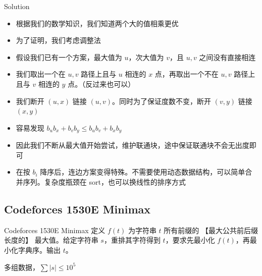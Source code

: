 ﻿\documentclass[aspectratio=169]{ctexbeamer}
\begin{document}
\begin{frame}{Solution}
    \begin{itemize}
        \item 根据我们的数学知识，我们知道两个大的值相乘更优
        \item 为了证明，我们考虑调整法
        \item 假设我们已有一个方案，最大值为 $u$，次大值为 $v$，且 $u,v$ 之间没有直接相连
        \item 我们取出一个在 $u,v$ 路径上且与 $u$ 相连的 $x$ 点，再取出一个不在 $u,v$ 路径上且与 $v$ 相连的 $y$ 点。（反过来也可以）
        \item 我们断开 $(u,x)$ 链接 $(u,v)$。同时为了保证度数不变，断开 $(v,y)$ 链接 $(x,y)$
        \item 容易发现 $b_ub_x+b_vb_y\le b_ub_v+b_xb_y$
        \item 因此我们不断从最大值开始尝试，维护联通块，途中保证联通块不会无出度即可
        \item 在按 $b_i$ 降序后，连边方案变得特殊。不需要使用动态数据结构，可以简单合并序列。复杂度瓶颈在 sort，也可以换线性的排序方式
    \end{itemize}    
\end{frame}







\subsection{Codeforces 1530E Minimax}
\begin{frame}{Codeforces 1530E Minimax}
    定义 $f(t)$ 为字符串 $t$ 所有前缀的 【最大公共前后缀长度的】 最大值。给定字符串 $s$，重排其字符得到 $t$，要求先最小化 $f(t)$，再最小化字典序。输出 $t$。
    
    多组数据，$\sum |s|\le 10^5$
\end{frame}
\end{document}
